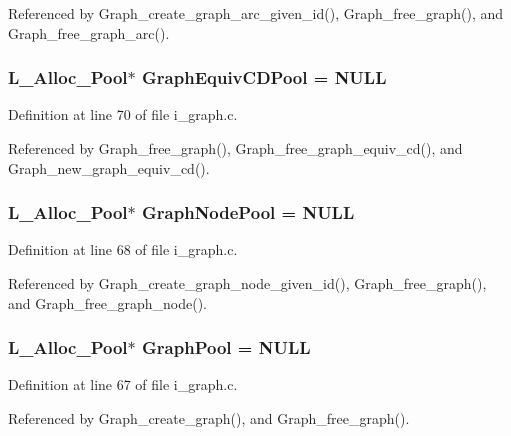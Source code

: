Referenced by Graph\_\-create\_\-graph\_\-arc\_\-given\_\-id(), Graph\_\-free\_\-graph(), and Graph\_\-free\_\-graph\_\-arc().
\subsubsection{\setlength{\rightskip}{0pt plus 5cm}\bf{L\_\-Alloc\_\-Pool}$\ast$ \bf{Graph\-Equiv\-CDPool} = NULL}\label{i__graph_8c_d4f2e18fd5ae06bb31f7a0afde51f904}




Definition at line 70 of file i\_\-graph.c.

Referenced by Graph\_\-free\_\-graph(), Graph\_\-free\_\-graph\_\-equiv\_\-cd(), and Graph\_\-new\_\-graph\_\-equiv\_\-cd().
\subsubsection{\setlength{\rightskip}{0pt plus 5cm}\bf{L\_\-Alloc\_\-Pool}$\ast$ \bf{Graph\-Node\-Pool} = NULL}\label{i__graph_8c_558eb3b24249c2d9a5abb043b3955ee4}




Definition at line 68 of file i\_\-graph.c.

Referenced by Graph\_\-create\_\-graph\_\-node\_\-given\_\-id(), Graph\_\-free\_\-graph(), and Graph\_\-free\_\-graph\_\-node().
\subsubsection{\setlength{\rightskip}{0pt plus 5cm}\bf{L\_\-Alloc\_\-Pool}$\ast$ \bf{Graph\-Pool} = NULL}\label{i__graph_8c_76c884200585b70dd51bbbe5016d1722}




Definition at line 67 of file i\_\-graph.c.

Referenced by Graph\_\-create\_\-graph(), and Graph\_\-free\_\-graph().